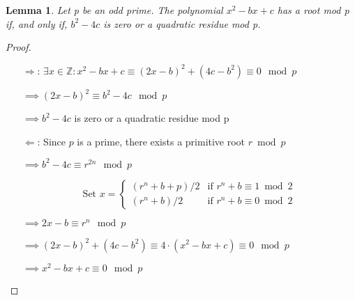 \documentclass{article}
\newtheorem{lem}{Lemma}
\theoremstyle{definition}\newtheorem{definition}{Definition}
\begin{document}
\begin{lem}
Let p be an odd prime. The polynomial $x^2- bx + c$ has a root mod p if, and only if, $b^2- 4c$ is zero or a quadratic residue mod p.	
\end{lem}
\begin{proof}\
	\begin{itemize}
		\item[$\Rightarrow$:]
		$\exists x \in \mathbb Z : x^2- bx + c \equiv (2x-b)^2+(4c-b^2) \equiv 0 \mod p$
		
		$\implies (2x-b)^2 \equiv  b^2- 4c \mod p$
		
		$\implies b^2- 4c$ is zero or a quadratic residue mod p
		\item[$\Leftarrow$:]
		Since $p$ is a prime, there exists a primitive root $r \bmod p$
		
		$\implies b^2- 4c \equiv r^{2n} \mod p$
		
		$$
			\text{Set }x=\begin{cases}
				(r^n+b+p)/2 & \text{if } r^n+b \equiv 1 \bmod 2\\
				(r^n+b)/2 & \text{if } r^n+b \equiv 0 \bmod 2
			\end{cases} 
		$$
		
		$\implies 2x - b \equiv r^{n} \mod p$
		
		$\implies (2x-b)^2+(4c-b^2) \equiv 4 \cdot (x^2- bx + c) \equiv 0 \mod p$
		
		$\implies x^2- bx + c \equiv 0 \mod p$
	\end{itemize}
\end{proof}
			
\end{document}
